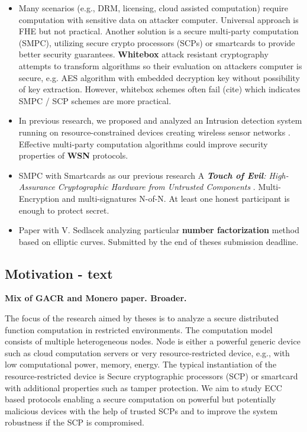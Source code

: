 \documentclass[
  digital, %
  twoside, %
  table,   %
  lof,     %
  lot,     %
]{fithesis3}
\newcounter{ph4_show_guides}
\theoremstyle{definition}
\theoremstyle{remark}
\begin{document}
\begin{ecmmnt}
\begin{itemize}
    \item Many scenarios (e.g., DRM, licensing, cloud assisted computation) require computation with sensitive data on attacker computer. Universal approach is FHE but not practical. Another solution is a secure multi-party computation (SMPC), utilizing secure crypto processors (SCPs) or smartcards to provide better security guarantees. {\bf{Whitebox}} attack resistant cryptography \cite{whitebox_klinec_santacrypt2013,Klinec2013thesis} attempts to transform algorithms so their evaluation on attackers computer is secure, e.g. AES algorithm with embedded decryption key without possibility of key extraction. However, whitebox schemes often fail (cite) which indicates SMPC / SCP schemes are more practical.
    
    \item In previous research, we proposed and analyzed an Intrusion detection system running on resource-constrained devices creating wireless sensor networks \cite{wsnprotectlayer}. Effective multi-party computation algorithms could improve security properties of {\bf{WSN}} protocols.
    
    \item SMPC with Smartcards as our previous research A {\it {\bf{Touch of Evil}}: High-Assurance Cryptographic Hardware from Untrusted Components} \cite{2017-ccs-mavroudis}. Multi-Encryption and multi-signatures N-of-N. At least one honest participant is enough to protect secret.
    
    \item Paper with V. Sedlacek analyzing particular {\bf{number factorization}} method based on elliptic curves. Submitted by the end of theses submission deadline.

\end{itemize}

\subsection{Motivation - text}

    {\bf{Mix of GACR and Monero paper. Broader.}}
    
    The focus of the research aimed by theses is to analyze a secure distributed function computation in restricted environments. The computation model consists of multiple heterogeneous nodes. Node is either a powerful generic device such as cloud computation servers or very resource-restricted device, e.g., with low computational power, memory, energy. The typical instantiation of the resource-restricted device is Secure cryptographic processors (SCP) or smartcard with additional properties such as tamper protection. 
    We aim to study ECC based protocols enabling a secure computation on powerful but potentially malicious devices with the help of trusted SCPs and to improve the system robustness if the SCP is compromised.
    

\end{ecmmnt}
\end{document}
